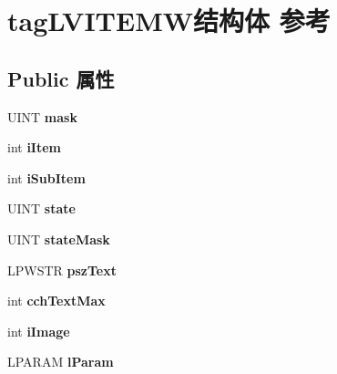 \hypertarget{structtag_l_v_i_t_e_m_w}{}\section{tag\+L\+V\+I\+T\+E\+M\+W结构体 参考}
\label{structtag_l_v_i_t_e_m_w}
\subsection*{Public 属性}
\begin{DoxyCompactItemize}
\item 
\mbox{\label{structtag_l_v_i_t_e_m_w_a72a1c2a41bb0a2deba3e99aa77ae750c}} 
U\+I\+NT {\bfseries mask}
\item 
\mbox{\label{structtag_l_v_i_t_e_m_w_ad9be54fc3d669d0109456e40525ced5b}} 
int {\bfseries i\+Item}
\item 
\mbox{\label{structtag_l_v_i_t_e_m_w_a3c9f68603de38efa466eb80740271725}} 
int {\bfseries i\+Sub\+Item}
\item 
\mbox{\label{structtag_l_v_i_t_e_m_w_a6c7c050906b4ed4c880d78e5fada0a32}} 
U\+I\+NT {\bfseries state}
\item 
\mbox{\label{structtag_l_v_i_t_e_m_w_a8baa713e7c132aebb38de5fa73a3d040}} 
U\+I\+NT {\bfseries state\+Mask}
\item 
\mbox{\label{structtag_l_v_i_t_e_m_w_a223ef070aa85683042623e6d748d7642}} 
L\+P\+W\+S\+TR {\bfseries psz\+Text}
\item 
\mbox{\label{structtag_l_v_i_t_e_m_w_a68032e5e3146ca45486cd657890f9357}} 
int {\bfseries cch\+Text\+Max}
\item 
\mbox{\label{structtag_l_v_i_t_e_m_w_a9f2dce398e451ed62f347e1421c4d38f}} 
int {\bfseries i\+Image}
\item 
\mbox{\label{structtag_l_v_i_t_e_m_w_a8123a1361380498f209fc35ab2a5880c}} 
L\+P\+A\+R\+AM {\bfseries l\+Param}
\item 

\end{DoxyCompactItemize}
